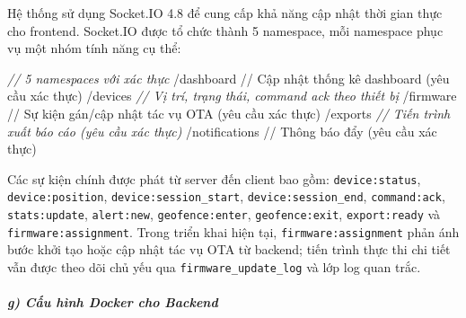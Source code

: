\documentclass[13pt,a4paper]{extarticle}
\newenvironment{Shaded}{}{}
\newcommand{\CommentTok}[1]{\textcolor[rgb]{0.38,0.63,0.69}{\textit{#1}}}
\newcommand{\FunctionTok}[1]{\textcolor[rgb]{0.02,0.16,0.49}{#1}}
\newcommand{\NormalTok}[1]{#1}
\newcommand{\OperatorTok}[1]{\textcolor[rgb]{0.40,0.40,0.40}{#1}}
\newcommand{\SpecialCharTok}[1]{\textcolor[rgb]{0.25,0.44,0.63}{#1}}
\newcommand{\SpecialStringTok}[1]{\textcolor[rgb]{0.73,0.40,0.53}{#1}}
\renewcommand{\\}{\thesislongtableorignewline\hline}%
\begin{document}
Hệ thống sử dụng Socket.IO 4.8 để cung cấp khả năng cập nhật thời gian
thực cho frontend. Socket.IO được tổ chức thành 5 namespace, mỗi
namespace phục vụ một nhóm tính năng cụ thể:

\begin{Shaded}
\begin{Highlighting}[]
\CommentTok{// 5 namespaces với xác thực}
\SpecialStringTok{/dashboard      // Cập nhật thống kê dashboard }\SpecialCharTok{(}\SpecialStringTok{yêu cầu xác thực}\SpecialCharTok{)}
\SpecialStringTok{/devices}        \CommentTok{// Vị trí, trạng thái, command ack theo thiết bị}
\SpecialStringTok{/firmware       // Sự kiện gán/cập}\NormalTok{ nhật tác vụ }\FunctionTok{OTA}\NormalTok{ (yêu cầu xác thực)}
\OperatorTok{/}\NormalTok{exports        }\CommentTok{// Tiến trình xuất báo cáo (yêu cầu xác thực)}
\SpecialStringTok{/notifications  // Thông báo đẩy }\SpecialCharTok{(}\SpecialStringTok{yêu cầu xác thực}\SpecialCharTok{)}
\end{Highlighting}
\end{Shaded}

Các sự kiện chính được phát từ server đến client bao gồm:
\texttt{device:status}, \texttt{device:position},
\texttt{device:session\_start}, \texttt{device:session\_end},
\texttt{command:ack}, \texttt{stats:update}, \texttt{alert:new},
\texttt{geofence:enter}, \texttt{geofence:exit}, \texttt{export:ready}
và \texttt{firmware:assignment}. Trong triển khai hiện tại,
\texttt{firmware:assignment} phản ánh bước khởi tạo hoặc cập nhật tác vụ
OTA từ backend; tiến trình thực thi chi tiết vẫn được theo dõi chủ yếu
qua \texttt{firmware\_update\_log} và lớp log quan trắc.

\subparagraph{g) Cấu hình Docker cho
Backend}\label{g-cux1ea5u-huxecnh-docker-cho-backend}
\end{document}
